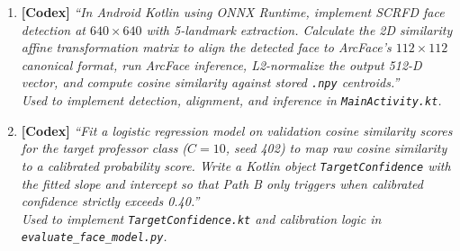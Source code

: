 \documentclass{article}
\begin{document}
\begin{enumerate}
    \item \textbf{[Codex]} \textit{``In Android Kotlin using ONNX Runtime, implement SCRFD face detection at $640\times640$ with 5-landmark extraction. Calculate the 2D similarity affine transformation matrix to align the detected face to ArcFace's $112\times112$ canonical format, run ArcFace inference, L2-normalize the output 512-D vector, and compute cosine similarity against stored \texttt{.npy} centroids.''} \\
    \textit{Used to implement detection, alignment, and inference in \texttt{MainActivity.kt}.}

    \item \textbf{[Codex]} \textit{``Fit a logistic regression model on validation cosine similarity scores for the target professor class ($C=10$, seed 402) to map raw cosine similarity to a calibrated probability score. Write a Kotlin object \texttt{TargetConfidence} with the fitted slope and intercept so that Path B only triggers when calibrated confidence strictly exceeds 0.40.''} \\
    \textit{Used to implement \texttt{TargetConfidence.kt} and calibration logic in \texttt{evaluate\_face\_model.py}.}
\end{enumerate}
\end{document}
